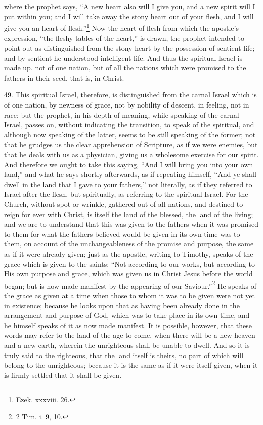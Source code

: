 where the prophet says, “A new heart also will I give you, and a new spirit will I put within you; and I will take away the stony heart out of your flesh, and I will give you an heart of flesh.”\footnote{Ezek. xxxviii. 26.} Now the heart of flesh from which the apostle’s expression, “the fleshy tables of the heart,” is drawn, the prophet intended to point out as distinguished from the stony heart by the possession of sentient life; and by sentient  he understood intelligent life. And thus the spiritual Israel is made up, not of one nation, but of all the nations which were promised to the fathers in their seed, that is, in Christ.

49. This spiritual Israel, therefore, is distinguished from the carnal Israel which is of one nation, by newness of grace, not by nobility of descent, in feeling, not in race; but the prophet, in his depth of meaning, while speaking of the carnal Israel, passes on, without indicating the transition, to speak of the spiritual, and although now speaking of the latter, seems to be still speaking of the former; not that he grudges us the clear apprehension of Scripture, as if we were enemies, but that he deals with us as a physician, giving us a wholesome exercise for our spirit. And therefore we ought to take this saying, “And I will bring you into your own land,” and what he says shortly afterwards, as if repeating himself, “And ye shall dwell in the land that I gave to your fathers,” not literally, as if they referred to Israel after the flesh, but spiritually, as referring to the spiritual Israel. For the Church, without spot or wrinkle, gathered out of all nations, and destined to reign for ever with Christ, is itself the land of the blessed, the land of the living; and we are to understand that this was given to the fathers when it was promised to them for what the fathers believed would be given in its own time was to them, on account of the unchangeableness of the promise and purpose, the same as if it were already given; just as the apostle, writing to Timothy, speaks of the grace which is given to the saints: “Not according to our works, but according to His own purpose and grace, which was given us in Christ Jesus before the world began; but is now made manifest by the appearing of our Saviour.”\footnote{2 Tim. i. 9, 10.} He speaks of the grace as given at a time when those to whom it was to be given were not yet in existence; because he looks upon that as having been already done in the arrangement and purpose of God, which was to take place in its own time, and he himself speaks of it as now made manifest. It is possible, however, that these words may refer to the land of the age to come, when there will be a new heaven and a new earth, wherein the unrighteous shall be unable to dwell. And so it is truly said to the righteous, that the land itself is theirs, no part of which will belong to the unrighteous; because it is the same as if it were itself given, when it is firmly settled that it shall be given.

